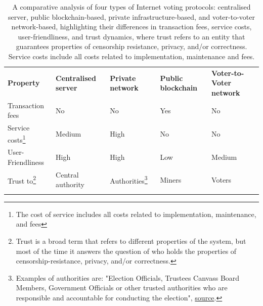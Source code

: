 \documentclass[runningheads]{llncs}
\begin{document}
\begin{table}[!h]
\centering
\newcommand{\YES}{\cellcolor{red!50}Yes}
\newcommand{\NO}{\cellcolor{green!50}No}
\begin{tabular}{p{}p{}p{}p{}p{}}
\noalign{\smallskip}\hline\noalign{\smallskip}
\textbf{Property} & \textbf{Centralised server} & \textbf{Private network} & \textbf{Public blockchain} & \textbf{Voter-to-Voter network}\\
\noalign{\smallskip}\hline\noalign{\smallskip}
Transaction fees & \NO & \NO & \YES & \NO \\
\hline
Service costs\footnote{The cost of service includes all costs related to implementation, maintenance, and fees} & \cellcolor{yellow!50} Medium & \cellcolor{red!50} High & \cellcolor{green!50} No  & \cellcolor{green!50} No \\
\hline
User-Friendliness & \cellcolor{green!50} High & \cellcolor{green!50}High & \cellcolor{red!50} Low & \cellcolor{yellow!50} Medium \\
\hline
Trust to\footnote{Trust is a broad term that refers to different properties of the system, but most of the time it answers the question of who holds the properties of censorship-resistance, privacy, and/or correctness.} & \cellcolor{red!50} Central authority & \cellcolor{yellow!50} Authorities\footnote{Examples of authorities are: "Election Officials, Trustees Canvass Board Members, Government Officials or other trusted authorities who are responsible and accountable for conducting the election", \href{http://www.electionguard.vote/basics/steps/1_Key_Ceremony/}{source}.} & \cellcolor{yellow!50} Miners & \cellcolor{yellow!50} Voters  \\
\noalign{\smallskip}\hline
\hline
\end{tabular}

\caption{A comparative analysis of four types of Internet voting protocols: centralised server, public blockchain-based, private infrastructure-based, and voter-to-voter network-based, highlighting their differences in transaction fees, service costs, user-friendliness, and trust dynamics, where trust refers to an entity that guarantees properties of censorship resistance, privacy, and/or correctness. Service costs include all costs related to implementation, maintenance and fees.}
\label{table-comparision}

\end{table}
\end{document}

